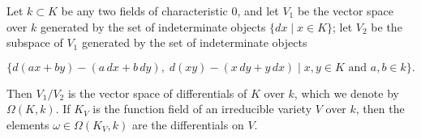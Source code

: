 Let $k \subset K$ be any two fields of characteristic $0$, and let $V_1$ be the vector space over $k$ generated by the set of indeterminate objects $\{dx \mid x \in K\}$; let $V_2$ be the subspace of $V_1$ generated by the set of indeterminate objects

$$\{d(ax + by) - (a\,dx + b\,dy),\; d(xy) - (x\,dy + y\,dx) \mid x, y \in K \text{ and } a, b \in k\}.$$

Then $V_1/V_2$ is the vector space of differentials of $K$ over $k$, which we denote by $\Omega(K, k)$. If $K_V$ is the function field of an irreducible variety $V$ over $k$, then the elements $\omega \in \Omega(K_V, k)$ are the differentials on $V$.
